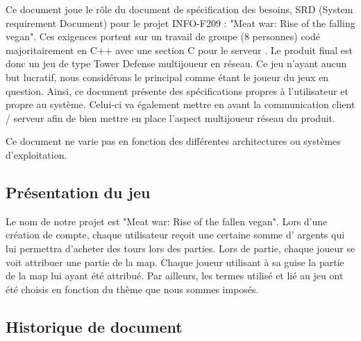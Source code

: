\documentclass[10pt,a4paper]{article}
\begin{document}
Ce document joue le rôle du document de spécification des besoins, SRD (System requirement Document) pour le projet INFO-F209 : "Meat war: Rise of the falling vegan".
  Ces exigences portent sur un travail de groupe (8 personnes) codé majoritairement en C++ avec une section C pour le \gls{serveur} . Le produit final est donc un jeu de type \gls{Tower Defense}  multijoueur en réseau.
Ce jeu n'ayant aucun but lucratif, nous considérons le  principal comme étant le \gls{joueur} du jeux en question.
Ainsi, ce document présente des spécifications propres à l'\gls{utilisateur} et propre au système. Celui-ci va également mettre en avant la communication \gls{client} / \gls{serveur}  afin de bien mettre en place l'aspect multijoueur réseau du produit. 


 Ce document ne varie pas en fonction des différentes architectures ou systèmes d'exploitation.

\subsection{Présentation du jeu}
 Le nom de notre projet est "Meat war: Rise of the fallen vegan".
Lors d'une création de \gls{compte}, chaque \gls{utilisateur} reçoit une certaine somme d' \glspl{argent}  qui lui permettra d'acheter des \gls{tours}  lors des parties.
\noindent Lors de partie, chaque \gls{joueur} se voit attribuer une partie de la \gls{map}. Chaque \gls{joueur} utilisant à sa guise la partie de la \gls{map} lui ayant été attribué. Par ailleurs, les termes utilisé et lié au jeu ont été choisis en fonction du thème que nous sommes imposés.

\glsaddall
\printglossary[numberedsection]

\subsection{Historique de document}
\end{document}
